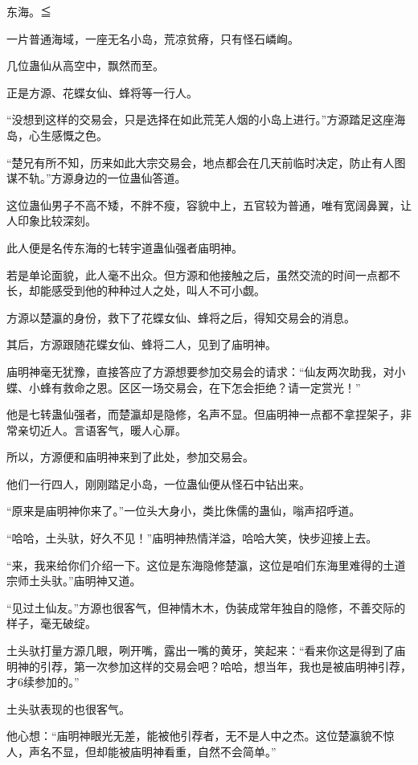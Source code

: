 
\begin{this_body}

东海。≦

一片普通海域，一座无名小岛，荒凉贫瘠，只有怪石嶙峋。

几位蛊仙从高空中，飘然而至。

正是方源、花蝶女仙、蜂将等一行人。

“没想到这样的交易会，只是选择在如此荒芜人烟的小岛上进行。”方源踏足这座海岛，心生感慨之色。

“楚兄有所不知，历来如此大宗交易会，地点都会在几天前临时决定，防止有人图谋不轨。”方源身边的一位蛊仙答道。

这位蛊仙男子不高不矮，不胖不瘦，容貌中上，五官较为普通，唯有宽阔鼻翼，让人印象比较深刻。

此人便是名传东海的七转宇道蛊仙强者庙明神。

若是单论面貌，此人毫不出众。但方源和他接触之后，虽然交流的时间一点都不长，却能感受到他的种种过人之处，叫人不可小觑。

方源以楚瀛的身份，救下了花蝶女仙、蜂将之后，得知交易会的消息。

其后，方源跟随花蝶女仙、蜂将二人，见到了庙明神。

庙明神毫无犹豫，直接答应了方源想要参加交易会的请求：“仙友两次助我，对小蝶、小蜂有救命之恩。区区一场交易会，在下怎会拒绝？请一定赏光！”

他是七转蛊仙强者，而楚瀛却是隐修，名声不显。但庙明神一点都不拿捏架子，非常亲切近人。言语客气，暖人心扉。

所以，方源便和庙明神来到了此处，参加交易会。

他们一行四人，刚刚踏足小岛，一位蛊仙便从怪石中钻出来。

“原来是庙明神你来了。”一位头大身小，类比侏儒的蛊仙，嗡声招呼道。

“哈哈，土头驮，好久不见！”庙明神热情洋溢，哈哈大笑，快步迎接上去。

“来，我来给你们介绍一下。这位是东海隐修楚瀛，这位是咱们东海里难得的土道宗师土头驮。”庙明神又道。

“见过土仙友。”方源也很客气，但神情木木，伪装成常年独自的隐修，不善交际的样子，毫无破绽。

土头驮打量方源几眼，咧开嘴，露出一嘴的黄牙，笑起来：“看来你这是得到了庙明神的引荐，第一次参加这样的交易会吧？哈哈，想当年，我也是被庙明神引荐，才6续参加的。”

土头驮表现的也很客气。

他心想：“庙明神眼光无差，能被他引荐者，无不是人中之杰。这位楚瀛貌不惊人，声名不显，但却能被庙明神看重，自然不会简单。”


\end{this_body}
